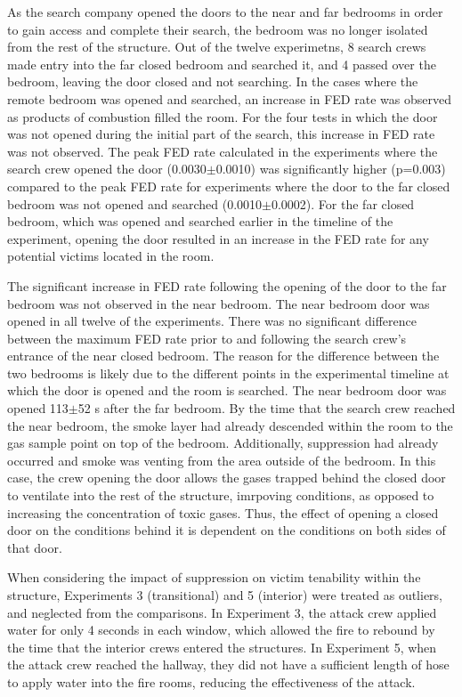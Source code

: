 \documentclass[12pt,oneside]{article}
\begin{document}
As the search company opened the doors to the near and far bedrooms in order to gain access and complete their search, the bedroom was no longer isolated from the rest of the structure. Out of the twelve experimetns, 8 search crews made entry into the far closed bedroom and searched it, and 4 passed over the bedroom, leaving the door closed and not searching. In the cases where the remote bedroom was opened and searched, an increase in FED rate was observed as products of combustion filled the room. For the four tests in which the door was not opened during the initial part of the search, this increase in FED rate was not observed. The peak FED rate calculated in the experiments where the search crew opened the door (0.0030$\pm$0.0010) was significantly higher (p=0.003) compared to the peak FED rate for experiments where the door to the far closed bedroom was not opened and searched (0.0010$\pm$0.0002). For the far closed bedroom, which was opened and searched earlier in the timeline of the experiment, opening the door resulted in an increase in the FED rate for any potential victims located in the room. 

The significant increase in FED rate following the opening of the door to the far bedroom was not observed in the near bedroom. The near bedroom door was opened in all twelve of the experiments. There was no significant difference between the maximum FED rate prior to and following the search crew's entrance of the near closed bedroom. The reason for the difference between the two bedrooms is likely due to the different points in the experimental timeline at which the door is opened and the room is searched. The near bedroom door was opened 113$\pm$52 s after the far bedroom. By the time that the search crew reached the near bedroom, the smoke layer had already descended within the room to the gas sample point on top of the bedroom. Additionally, suppression had already occurred and smoke was venting from the area outside of the bedroom. In this case, the crew opening the door allows the gases trapped behind the closed door to ventilate into the rest of the structure, imrpoving conditions, as opposed to increasing the concentration of toxic gases. Thus, the effect of opening a closed door on the conditions behind it is dependent on the conditions on both sides of that door. 

When considering the impact of suppression on victim tenability within the structure, Experiments 3 (transitional) and 5 (interior) were treated as outliers, and neglected from the comparisons. In Experiment 3, the attack crew applied water for only 4 seconds in each window, which allowed the fire to rebound by the time that the interior crews entered the structures. In Experiment 5, when the attack crew reached the hallway, they did not have a sufficient length of hose to apply water into the fire rooms, reducing the effectiveness of the attack. 
\end{document}

